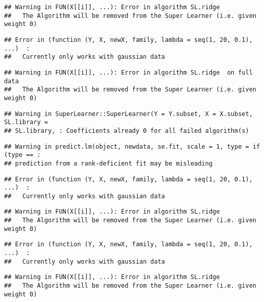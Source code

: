 \documentclass[
]{article}
\begin{document}
\begin{verbatim}
## Warning in FUN(X[[i]], ...): Error in algorithm SL.ridge 
##   The Algorithm will be removed from the Super Learner (i.e. given weight 0)
\end{verbatim}

\begin{verbatim}
## Error in (function (Y, X, newX, family, lambda = seq(1, 20, 0.1), ...)  : 
##   Currently only works with gaussian data
\end{verbatim}

\begin{verbatim}
## Warning in FUN(X[[i]], ...): Error in algorithm SL.ridge  on full data 
##   The Algorithm will be removed from the Super Learner (i.e. given weight 0)
\end{verbatim}

\begin{verbatim}
## Warning in SuperLearner::SuperLearner(Y = Y.subset, X = X.subset, SL.library =
## SL.library, : Coefficients already 0 for all failed algorithm(s)
\end{verbatim}

\begin{verbatim}
## Warning in predict.lm(object, newdata, se.fit, scale = 1, type = if (type == :
## prediction from a rank-deficient fit may be misleading
\end{verbatim}

\begin{verbatim}
## Error in (function (Y, X, newX, family, lambda = seq(1, 20, 0.1), ...)  : 
##   Currently only works with gaussian data
\end{verbatim}

\begin{verbatim}
## Warning in FUN(X[[i]], ...): Error in algorithm SL.ridge 
##   The Algorithm will be removed from the Super Learner (i.e. given weight 0)
\end{verbatim}

\begin{verbatim}
## Error in (function (Y, X, newX, family, lambda = seq(1, 20, 0.1), ...)  : 
##   Currently only works with gaussian data
\end{verbatim}

\begin{verbatim}
## Warning in FUN(X[[i]], ...): Error in algorithm SL.ridge 
##   The Algorithm will be removed from the Super Learner (i.e. given weight 0)
\end{verbatim}
\end{document}
